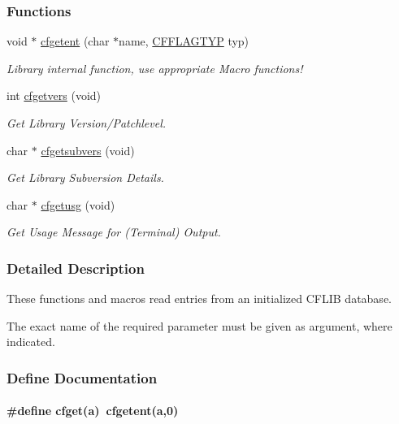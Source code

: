 \subsubsection*{Functions}
\begin{CompactItemize}
\item 
void $\ast$ \hyperlink{group__retrieval_g872f83b13a8f722176f5e299f2a42e0f}{cfgetent} (char $\ast$name, \hyperlink{group__special__options__mask_g4854f1596d5c6e0604a478fa9a2e23f0}{CFFLAGTYP} typ)
\begin{CompactList}\small\item\em Library internal function, use appropriate Macro functions! \item\end{CompactList}\item 
int \hyperlink{group__retrieval_gc4e376e3630e9b25655ee0e0b1a54a5b}{cfgetvers} (void)
\begin{CompactList}\small\item\em Get Library Version/Patchlevel. \item\end{CompactList}\item 
char $\ast$ \hyperlink{group__retrieval_gbd4ca2adbcac9eef4d1363424e440662}{cfgetsubvers} (void)
\begin{CompactList}\small\item\em Get Library Subversion Details. \item\end{CompactList}\item 
char $\ast$ \hyperlink{group__retrieval_ge272c1881db940e56c8cc364df730271}{cfgetusg} (void)
\begin{CompactList}\small\item\em Get Usage Message for (Terminal) Output. \item\end{CompactList}\end{CompactItemize}


\subsubsection{Detailed Description}
These functions and macros read entries from an initialized CFLIB database. 

The exact name of the required parameter must be given as argument, where indicated. 

\subsubsection{Define Documentation}
\hypertarget{group__retrieval_g5e2da3f6cf3e36a910362660d167f790}{
\paragraph[{cfget}]{\setlength{\rightskip}{0pt plus 5cm}\#define cfget(a)~cfgetent(a,0)}\hfill}
\label{group__retrieval_g5e2da3f6cf3e36a910362660d167f790}


